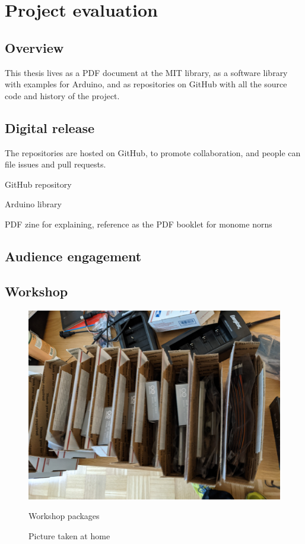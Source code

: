 \chapter{Project evaluation}

\section{Overview}

This thesis lives as a PDF document at the MIT library, as a software library with examples for Arduino, and as repositories on GitHub with all the source code and history of the project.

\section{Digital release}

The repositories are hosted on GitHub, to promote collaboration, and people can file issues and pull requests.

GitHub repository

Arduino library

PDF zine for explaining, reference as the PDF booklet for monome norns

\section{Audience engagement}


\section{Workshop}

\begin{figure}[h]
	\centering
	  \includegraphics[width=0.75\linewidth,height=0.25\textheight,keepaspectratio]{images/workshop-packages.jpg}
	\caption{Workshop packages}
	\caption*{Picture taken at home}
	\label{fig:workshop-packages}
      \end{figure}

